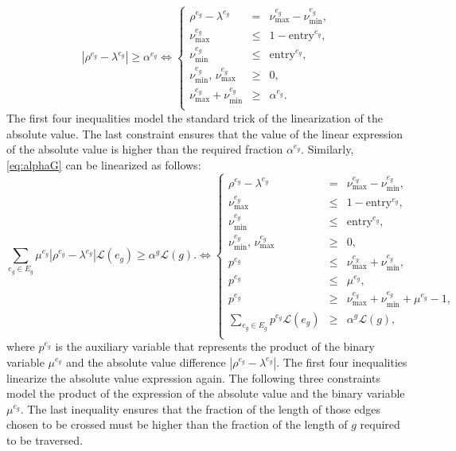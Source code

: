 \documentclass[10pt,a4paper]{elsarticle}
\newcommand{\EN}[1]{{\color{black}#1}}
\begin{document}
\begin{equation}\label{eq:alpha-E}\tag{$\alpha$-E}
|\rho^{e_g}-\lambda^{e_g}|\geq \alpha^{e_g} \Longleftrightarrow
\left\{
\begin{array}{ccl}
\rho^{e_g} - \lambda^{e_g}                       & =    & \nu_\text{max}^{e_g} - \nu_\text{min}^{e_g},                                     \\
\nu_\text{max}^{e_g}                         & \leq & 1-{\text{entry}^{e_g}},                                   \\
\nu_\text{min}^{e_g}                      & \leq & {  \text{entry}^{e_g}},                                        \\
\nu_\text{min}^{e_g}, \,\nu_\text{max}^{e_g} & \geq & 0, \\

\nu_\text{max}^{e_g} + \nu_\text{min}^{e_g} & \geq & \alpha^{e_g}.
\\
\end{array}
\right.
\end{equation}
The first four inequalities model the standard trick of the linearization of the absolute value. The last constraint ensures that the value of the linear expression of the absolute value is higher than the required fraction $\alpha^{e_g}$.
\noindent
Similarly, \eqref{eq:alphaG} can be linearized as follows:
\begin{equation}\label{eq:alpha-G}\tag{$\alpha$-G}
\sum_{e_g\in E_g} \mu^{e_g}|\rho^{e_g}-\lambda^{e_g}|\mathcal L(e_g)\geq \alpha^g\mathcal L(g). \Longleftrightarrow
\left\{
\begin{array}{ccl}
\rho^{e_g} - \lambda^{e_g}                       & =    & \nu_\text{max}^{e_g} - \nu_\text{min}^{e_g},                                     \\
\nu_\text{max}^{e_g}                         & \leq & 1-{\text{entry}^{e_g}},                                   \\
\nu_\text{min}^{e_g}                      & \leq & {  \text{entry}^{e_g}},                                        \\
\nu_\text{min}^{e_g}, \,\nu_\text{max}^{e_g} & \geq & 0, \\
p^{e_g} & \leq & \nu_\text{max}^{e_g} + \nu_\text{min}^{e_g}, \\
p^{e_g} & \leq & \mu^{e_g}, \\
p^{e_g} & \geq & \nu_\text{max}^{e_g} + \nu_\text{min}^{e_g} + \mu^{e_g} - 1, \\
\sum_{e_g\in E_g} p^{e_g}\mathcal L(e_g) & \geq & \alpha^{g}\mathcal L(g),
\\
\end{array}
\right.
\end{equation}
where $p^{e_g}$ is the auxiliary variable that represents the product of the binary variable $\mu^{e_g}$ and the absolute value difference $|\rho^{e_g} - \lambda^{e_g}|$. The first four inequalities linearize the absolute value expression \EN{again}. The following three constraints model the product of the expression of the absolute value and the binary variable $\mu^{e_g}$. The last inequality ensures that the fraction of the length of those edges chosen to be crossed must be higher than the fraction of the length of $g$ required to be traversed.
\end{document}
